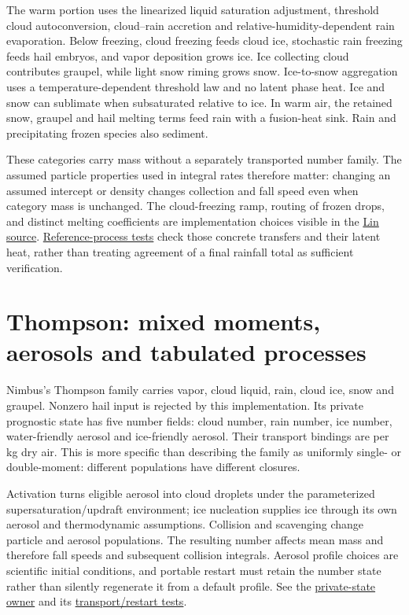 \documentclass[
  11pt,
]{report}
\begin{document}
The warm portion uses the linearized liquid saturation adjustment,
threshold cloud autoconversion, cloud--rain accretion and
relative-humidity-dependent rain evaporation. Below freezing, cloud
freezing feeds cloud ice, stochastic rain freezing feeds hail embryos,
and vapor deposition grows ice. Ice collecting cloud contributes
graupel, while light snow riming grows snow. Ice-to-snow aggregation
uses a temperature-dependent threshold law and no latent phase heat. Ice
and snow can sublimate when subsaturated relative to ice. In warm air,
the retained snow, graupel and hail melting terms feed rain with a
fusion-heat sink. Rain and precipitating frozen species also sediment.

These categories carry mass without a separately transported number
family. The assumed particle properties used in integral rates therefore
matter: changing an assumed intercept or density changes collection and
fall speed even when category mass is unchanged. The cloud-freezing
ramp, routing of frozen drops, and distinct melting coefficients are
implementation choices visible in the
\href{../src/microphysics/schemes/lin/lin.cpp}{Lin source}.
\href{../tests/qualification/test_lin_reference_processes.cpp}{Reference-process
tests} check those concrete transfers and their latent heat, rather than
treating agreement of a final rainfall total as sufficient verification.

\section{Thompson: mixed moments, aerosols and tabulated
processes}\label{thompson-mixed-moments-aerosols-and-tabulated-processes}

Nimbus's Thompson family carries vapor, cloud liquid, rain, cloud ice,
snow and graupel. Nonzero hail input is rejected by this implementation.
Its private prognostic state has five number fields: cloud number, rain
number, ice number, water-friendly aerosol and ice-friendly aerosol.
Their transport bindings are per kg dry air. This is more specific than
describing the family as uniformly single- or double-moment: different
populations have different closures.

Activation turns eligible aerosol into cloud droplets under the
parameterized supersaturation/updraft environment; ice nucleation
supplies ice through its own aerosol and thermodynamic assumptions.
Collision and scavenging change particle and aerosol populations. The
resulting number affects mean mass and therefore fall speeds and
subsequent collision integrals. Aerosol profile choices are scientific
initial conditions, and portable restart must retain the number state
rather than silently regenerate it from a default profile. See the
\href{../src/microphysics/schemes/thompson/prognostic_state.hpp}{private-state
owner} and its
\href{../tests/physics/test_thompson_prognostic_state.cpp}{transport/restart
tests}.
\end{document}

